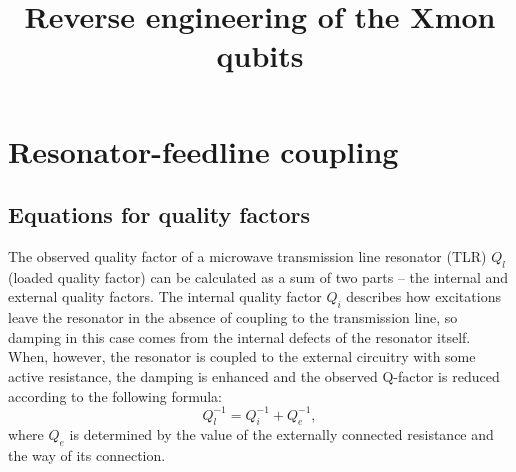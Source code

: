 \documentclass[12pt]{report}
\title{Reverse engineering of the Xmon qubits}
\numberwithin{equation}{section}
\begin{document}
\maketitle
\tableofcontents

\chapter{Resonator-feedline coupling}

\section{Equations for quality factors}

The observed quality factor of a microwave transmission line resonator (TLR) $Q_l$ (loaded quality factor) can be calculated as a sum of two parts -- the internal and external quality factors. The internal quality factor $Q_i$ describes how excitations leave the resonator in the absence of coupling to the transmission line, so damping in this case comes from the internal defects of the resonator itself. When, however, the resonator is coupled to the external circuitry with some active resistance, the damping is enhanced and the observed Q-factor is reduced according to the following formula:
\begin{equation}
Q_l^{-1} = Q_i^{-1}+Q_e^{-1},
\label{eq:qfactor}
\end{equation}
where $Q_e$ is determined by the value of the externally connected resistance and the way of its connection.
\end{document}
